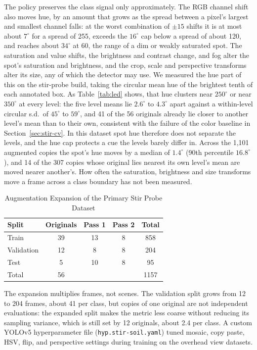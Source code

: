 ﻿\documentclass[journal]{IEEEtran}
\begin{document}
The policy preserves the class signal only approximately. The RGB channel shift also moves hue, by an amount that grows as the spread between a pixel's largest and smallest channel falls: at the worst combination of $\pm 15$ shifts it is at most about $7^{\circ}$ for a spread of 255, exceeds the $16^{\circ}$ cap below a spread of about 120, and reaches about $34^{\circ}$ at 60, the range of a dim or weakly saturated spot. The saturation and value shifts, the brightness and contrast change, and fog alter the spot's saturation and brightness, and the crop, scale and perspective transforms alter its size, any of which the detector may use. We measured the hue part of this on the stir-probe build, taking the circular mean hue of the brightest tenth of each annotated box. As Table~\ref{tab:led} shows, that hue clusters near $250^{\circ}$ or near $350^{\circ}$ at every level: the five level means lie $2.6^{\circ}$ to $4.3^{\circ}$ apart against a within-level circular s.d.\ of $45^{\circ}$ to $59^{\circ}$, and 41 of the 56 originals already lie closer to another level's mean than to their own, consistent with the failure of the color baseline in Section~\ref{sec:stir-cv}. In this dataset spot hue therefore does not separate the levels, and the hue cap protects a cue the levels barely differ in. Across the 1{,}101 augmented copies the spot's hue moves by a median of $1.4^{\circ}$ (90th percentile $16.8^{\circ}$), and 14 of the 307 copies whose original lies nearest its own level's mean are moved nearer another's. How often the saturation, brightness and size transforms move a frame across a class boundary has not been measured.

\begin{table}[!t]
\renewcommand{\arraystretch}{1.3}
\caption{Augmentation Expansion of the Primary Stir Probe Dataset}
\label{tab:aug}
\centering
\begin{tabular}{l c c c c}
\toprule
\textbf{Split} & \textbf{Originals} & \textbf{Pass 1} & \textbf{Pass 2} & \textbf{Total} \\
\midrule
Train      & 39 & 13 & 8 & 858 \\
Validation & 12 & 8  & 8 & 204 \\
Test       & 5  & 10 & 8 & 95 \\
\midrule
Total      & 56 &    &   & 1157 \\
\bottomrule
\end{tabular}
\end{table}

The expansion multiplies frames, not scenes. The validation split grows from 12 to 204 frames, about 41 per class, but copies of one original are not independent evaluations: the expanded split makes the metric less coarse without reducing its sampling variance, which is still set by 12 originals, about 2.4 per class. A custom YOLOv5 hyperparameter file (\texttt{hyp.stir-soil.yaml}) tuned mosaic, copy paste, HSV, flip, and perspective settings during training on the overhead view datasets.
\end{document}
